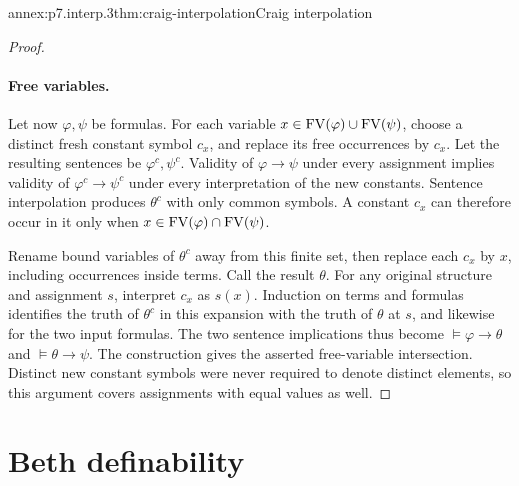 \begin{annexitem}{annex:p7.interp.3}{thm:craig-interpolation}{Craig interpolation}
\begin{proof}
\paragraph{Free variables.}
Let now \(\varphi,\psi\) be formulas.
For each variable \(x\in\operatorname{FV}(\varphi)\cup\operatorname{FV}(\psi)\), choose a distinct
fresh constant symbol \(c_x\), and replace its free occurrences by
\(c_x\).  Let the resulting sentences be \(\varphi^c,\psi^c\).
Validity of \(\varphi\to\psi\) under every assignment implies
validity of \(\varphi^c\to\psi^c\) under every interpretation of the
new constants.
Sentence interpolation produces \(\theta^c\) with only common
symbols.  A constant \(c_x\) can therefore occur in it only when
\(x\in\operatorname{FV}(\varphi)\cap\operatorname{FV}(\psi)\).

Rename bound variables of \(\theta^c\) away from this finite set,
then replace each \(c_x\) by \(x\), including occurrences inside terms.
Call the result \(\theta\).
For any original structure and assignment \(s\), interpret
\(c_x\) as \(s(x)\).  Induction on terms and formulas identifies
the truth of \(\theta^c\) in this expansion with the truth of
\(\theta\) at \(s\), and likewise for the two input formulas.
The two sentence implications thus become
\(\models\varphi\to\theta\) and \(\models\theta\to\psi\).
The construction gives the asserted free-variable intersection.
Distinct new constant symbols were never required to denote
distinct elements, so this argument covers assignments with equal
values as well.
\end{proof}
\end{annexitem}

\section{Beth definability}

